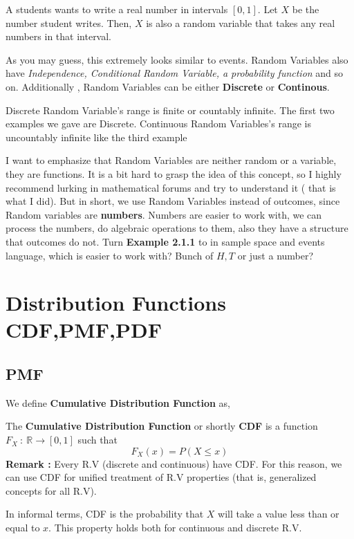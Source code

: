 \begin{example}
    A students wants to write a real number in intervals $[0,1]$. Let $X$ be the number student writes. Then, $X$ is also a random variable that takes any real numbers in that interval.
\end{example}

As you may guess, this extremely looks similar to events. Random Variables also have \textit{Independence, Conditional Random Variable, a probability function} and so on. Additionally , Random Variables can be either \textbf{Discrete} or \textbf{Continous}.
\par 
Discrete Random Variable's range is finite or countably infinite. The first two examples we gave are Discrete. Continuous Random Variables's range is uncountably infinite like the third example \newline

I want to emphasize  that Random Variables are neither random or a variable, they are functions. It is a bit hard to grasp the idea of this concept, so I highly recommend lurking in mathematical forums and try to understand it ( that is what I did). But in short, we use Random Variables instead of outcomes, since Random variables are \textbf{numbers}. Numbers are easier to work with, we can process the numbers, do algebraic operations to them, also they have a structure that outcomes do not.
Turn \textbf{ Example 2.1.1} to in sample space and events language, which is easier to work with? Bunch of $H,T$ or just a number?





\section{Distribution Functions CDF,PMF,PDF}
\subsection*{PMF}
We define  \textbf{Cumulative Distribution Function} as,

\begin{definition}
    The \textbf{Cumulative Distribution Function} or shortly \textbf{CDF} is a function $F_X \ : \ \mathbb{R} \rightarrow [0,1]$ such that
    \[ F_X(x) = P( X \le x) \]
    \textbf{Remark :} Every R.V (discrete and continuous) have CDF. For this reason, we can use CDF for unified treatment of R.V properties (that is, generalized concepts for all R.V).
\end{definition}
\par
In informal terms, CDF is the probability that $X$ will take a value less than or equal to $x$. This property holds both for continuous and discrete R.V.
\par 

